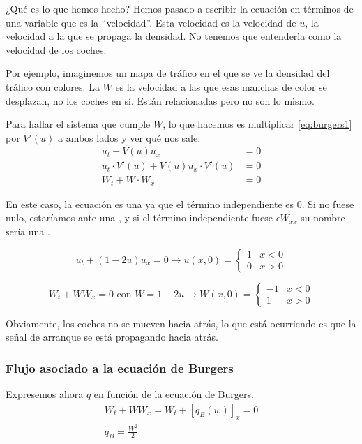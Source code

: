 		¿Qué es lo que hemos hecho? Hemos pasado a escribir la ecuación en términos de una variable que es la ``velocidad''. Esta velocidad es la velocidad de $u$, la velocidad a la que se propaga la densidad. No tenemos que entenderla como la velocidad de los coches.

		Por ejemplo, imaginemos un mapa de tráfico en el que se ve la densidad del tráfico con colores. La $W$ es la velocidad a las que esas manchas de color se desplazan, no los coches en sí. Están relacionadas pero no son lo mismo.

		Para hallar el sistema que cumple $W$, lo que hacemos es multiplicar \eqref{eq:burgers1} por $V'(u)$ a ambos lados y ver qué nos sale:
		\begin{align}
		u_t + V(u)u_x &= 0 \nonumber \\
		u_t · V'(u) + V(u) u_x · V'(u) &= 0 \nonumber \\
		W_t + W · W_x &= 0 \label{eq:Burgers}
		\end{align}

		En este caso, la ecuación es una  ya que el término independiente es $0$. Si no fuese nulo, estaríamos ante una , y si el término independiente fuese $\epsilon W_{xx}$ su nombre sería una .

		\begin{example}
			\[u_t + (1-2u) u_x = 0
			\rightarrow u(x,0) =
			\begin{cases}
				1 & x < 0 \\
				0 & x > 0
			\end{cases}
			\]

			\[W_t + W W_x = 0 \text{ con } W = 1 - 2u
			\rightarrow W(x,0) =
			\begin{cases}
				-1 & x < 0 \\
				1 & x > 0
			\end{cases}
			\]

			Obviamente, los coches no se mueven hacia atrás, lo que está ocurriendo es que la señal de arranque se está propagando hacia atrás.

		\end{example}


		\subsubsection{Flujo asociado a la ecuación de Burgers}

			Expresemos ahora $q$ en función de la ecuación de Burgers.
			\begin{gather}
			W_t + WW_x = W_t + [q_B(w)]_x = 0 \nonumber \\
			q_{B} = \frac{W^2}{2} \label{eq:FlujoBurgers}
			\end{gather}

